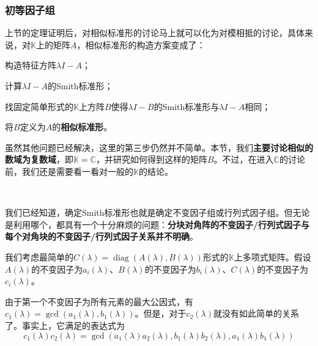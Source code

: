 \documentclass[a4paper,UTF8,fontset=windows,AutoFakeBold]{ctexart}
\DeclareMathOperator{\diag}{diag}
\begin{document}
\subsubsection{初等因子组}
上节的定理证明后，对相似标准形的讨论马上就可以化为对模相抵的讨论，具体来说，对$\mathbb{K}$上的矩阵$A$，相似标准形的构造方案变成了：
\begin{compactitem}
    \item 构造特征方阵$\lambda I-A$；
    \item 计算$\lambda I-A$的Smith标准形；
    \item 找固定简单形式的$\mathbb{K}$上方阵$B$使得$\lambda I-B$的Smith标准形与$\lambda I-A$相同；
    \item 将$B$定义为$A$的\textbf{相似标准形}。
\end{compactitem}

虽然其他问题已经解决，这里的第三步仍然并不简单。本节，我们\textbf{主要讨论相似的数域为复数域}，即$\mathbb{K}=\mathbb{C}$，并研究如何得到这样的矩阵$B$。不过，在进入$\mathbb{C}$的讨论前，我们还是需要看一看对一般的$\mathbb{K}$的结论。

\

我们已经知道，确定Smith标准形也就是确定不变因子组或行列式因子组。但无论是利用哪个，都具有一个十分麻烦的问题：\textbf{分块对角阵的不变因子/行列式因子与每个对角块的不变因子/行列式因子关系并不明确}。

我们考虑最简单的$C(\lambda)=\diag(A(\lambda),B(\lambda))$形式的$\mathbb{K}$上多项式矩阵。假设$A(\lambda)$的不变因子为$a_i(\lambda)$、$B(\lambda)$的不变因子为$b_i(\lambda)$、$C(\lambda)$的不变因子为$c_i(\lambda)$。

由于第一个不变因子为所有元素的最大公因式，有$c_1(\lambda)=\gcd(a_1(\lambda),b_1(\lambda))$。但是，对于$c_2(\lambda)$就没有如此简单的关系了。事实上，它满足的表达式为
$$c_1(\lambda)c_2(\lambda)=\gcd(a_1(\lambda)a_2(\lambda),b_1(\lambda)b_2(\lambda),a_1(\lambda)b_1(\lambda))$$
\end{document}
